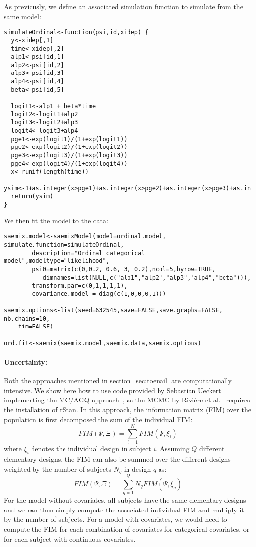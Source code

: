 As previously, we define an associated simulation function to simulate from the same model:
\begin{verbatim}
simulateOrdinal<-function(psi,id,xidep) {
  y<-xidep[,1]
  time<-xidep[,2]
  alp1<-psi[id,1]
  alp2<-psi[id,2]
  alp3<-psi[id,3]
  alp4<-psi[id,4]
  beta<-psi[id,5]
  
  logit1<-alp1 + beta*time
  logit2<-logit1+alp2
  logit3<-logit2+alp3
  logit4<-logit3+alp4
  pge1<-exp(logit1)/(1+exp(logit1))
  pge2<-exp(logit2)/(1+exp(logit2))
  pge3<-exp(logit3)/(1+exp(logit3))
  pge4<-exp(logit4)/(1+exp(logit4))
  x<-runif(length(time))
  ysim<-1+as.integer(x>pge1)+as.integer(x>pge2)+as.integer(x>pge3)+as.integer(x>pge4)
  return(ysim)
}
\end{verbatim}

We then fit the model to the data:
\begin{verbatim}
saemix.model<-saemixModel(model=ordinal.model, simulate.function=simulateOrdinal,
        description="Ordinal categorical model",modeltype="likelihood",
        psi0=matrix(c(0,0.2, 0.6, 3, 0.2),ncol=5,byrow=TRUE,
           dimnames=list(NULL,c("alp1","alp2","alp3","alp4","beta"))),
        transform.par=c(0,1,1,1,1),
        covariance.model = diag(c(1,0,0,0,1)))

saemix.options<-list(seed=632545,save=FALSE,save.graphs=FALSE, nb.chains=10, 
    fim=FALSE)

ord.fit<-saemix(saemix.model,saemix.data,saemix.options)
\end{verbatim}

\paragraph{Uncertainty:} Both the approaches mentioned in section~\ref{sec:toenail} are computationally intensive. We show here how to use code provided by Sebastian Ueckert implementing the MC/AGQ approach~\cite{Ueckert16}, as the MCMC by Rivière et al.~\cite{Riviere16} requires the installation of {\sf rStan}. In this approach, the information matrix (FIM) over the population is first decomposed the sum of the individual FIM:
$$
FIM(\Psi, \Xi) = \sum_{i=1}^{N} FIM(\Psi, \xi_i)
$$
where $\xi_i$ denotes the individual design in subject $i$. Assuming $Q$ different elementary designs, the FIM can also be summed over the different designs weighted by the number of subjects $N_q$ in design $q$ as:
$$
FIM(\Psi, \Xi) = \sum_{q=1}^{Q} N_q FIM(\Psi, \xi_q)
$$
For the model without covariates, all subjects have the same elementary designs and we can then simply compute the associated individual FIM and multiply it by the number of subjects. For a model with covariates, we would need to compute the FIM for each combination of covariates for categorical covariates, or for each subject with continuous covariates.

